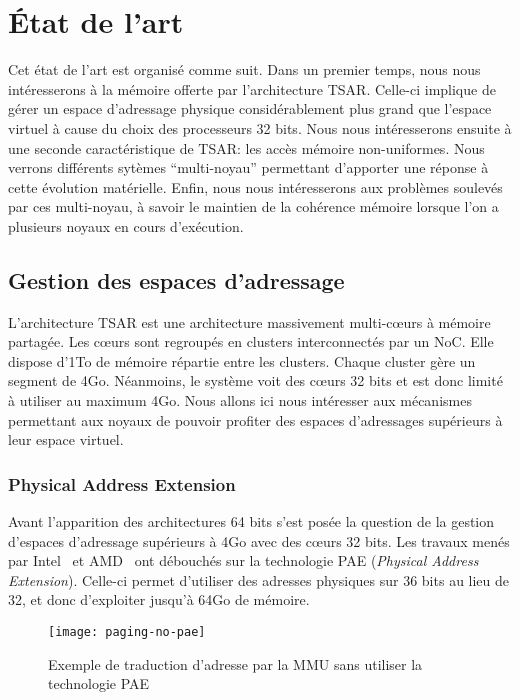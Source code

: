\chapter{État de l’art}

  Cet état de l'art est organisé comme suit. Dans un premier temps, nous nous
  intéresserons à la mémoire offerte par l'architecture TSAR. Celle-ci implique
  de gérer un espace d'adressage physique considérablement plus grand que
  l'espace virtuel à cause du choix des processeurs 32 bits. Nous nous
  intéresserons ensuite à une seconde caractéristique de TSAR: les accès mémoire
  non-uniformes. Nous verrons différents sytèmes ``multi-noyau'' permettant
  d'apporter une réponse à cette évolution matérielle. Enfin, nous nous
  intéresserons aux problèmes soulevés par ces multi-noyau, à savoir le maintien
  de la cohérence mémoire lorsque l'on a plusieurs noyaux en cours d'exécution.


  \section{Gestion des espaces d'adressage}
  \label{sec:memory}    

    L'architecture TSAR est une architecture massivement multi-c\oe urs à
    mémoire partagée. Les c\oe urs sont regroupés en clusters interconnectés par
    un NoC. Elle dispose d'1To de mémoire répartie entre les clusters. Chaque
    cluster gère un segment de 4Go. Néanmoins, le système voit des c\oe urs 32
    bits et est donc limité à utiliser au maximum 4Go. Nous allons ici nous
    intéresser aux mécanismes permettant aux noyaux de pouvoir profiter des
    espaces d'adressages supérieurs à leur espace virtuel.

    \subsection{Physical Address Extension}

      Avant l'apparition des architectures 64 bits s'est posée la question de la
      gestion d'espaces d'adressage supérieurs à 4Go avec des c\oe urs 32
      bits. Les travaux menés par Intel~\citep{patent6349380} et
      AMD~\citep{amd2000system} ont débouchés sur la technologie
      PAE (\textit{Physical
        Address Extension}). Celle-ci permet d'utiliser des adresses physiques
      sur 36 bits au lieu de 32, et donc d'exploiter jusqu'à 64Go de mémoire.

      \begin{figure}[ht]
        \centering \texttt{[image: paging-no-pae]}
        \caption{Exemple de traduction d'adresse par la MMU sans utiliser la
          technologie PAE}
        \label{fig:paging-no-pae}
      \end{figure}

